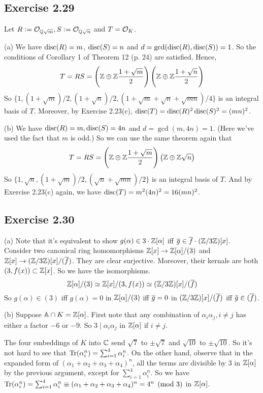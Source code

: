 \documentclass[../Marcus.tex]{subfiles}
\begin{document}
\subsection*{Exercise 2.29}

Let $R:=\mathcal{O}_{\mathbb{Q}\sqrt{m}},S:=\mathcal{O}_{\mathbb{Q}\sqrt{n}}$ and $T=\mathcal{O}_K$. 

(a) We have $\operatorname{disc}(R)=m$, $\operatorname{disc}(S)=n$ and $d=\gcd(\operatorname{disc}(R),\operatorname{disc}(S))=1$. So the conditions of Corollary 1 of Theorem 12 (p. 24) are satisfied. Hence, $$T=RS=\left(\mathbb{Z}\oplus\mathbb{Z}\frac{1+\sqrt{m}}{2}\right)\left(\mathbb{Z}\oplus\mathbb{Z}\frac{1+\sqrt{n}}{2}\right)$$ So $\{1,(1+\sqrt{m})/2,(1+\sqrt{n})/2,(1+\sqrt{m}+\sqrt{n}+\sqrt{mn})/4\}$ is an integral basis of $T$. Moreover, by Exercise 2.23(c), $\operatorname{disc}(T)=\operatorname{disc}(R)^2\operatorname{disc}(S)^2=(mn)^2$.  

(b) We have $\operatorname{disc}(R)=m,\operatorname{disc}(S)=4n$ and $d=\gcd(m,4n)=1$. (Here we've used the fact that $m$ is odd.) So we can use the same theorem again that
$$T=RS=\left(\mathbb{Z}\oplus\mathbb{Z}\frac{1+\sqrt{m}}{2}\right)\left(\mathbb{Z}\oplus\mathbb{Z}\sqrt{n}\right)$$ So $\{1,\sqrt{n},(1+\sqrt{m})/2,(\sqrt{n}+\sqrt{mn})/2\}$ is an integral basis of $T$. And by Exercise 2.23(c) again, we have $\operatorname{disc}(T)=m^2(4n)^2=16(mn)^2$.

\subsection*{Exercise 2.30}

(a) Note that it's equivalent to show $g(\alpha)\in3\cdot\mathbb{Z}[\alpha]$ iff $\overline{g}\in\overline{f}\cdot(\mathbb{Z}/3\mathbb{Z})[x]$. Consider two canonical ring homomorphisms $\mathbb{Z}[x]\to\mathbb{Z}[\alpha]/(3)$ and $\mathbb{Z}[x]\to(\mathbb{Z}/3\mathbb{Z})[x]/(\overline{f})$. They are clear surjective. Moreover, their kernals are both $(3,f(x))\subset\mathbb{Z}[x]$. So we have the isomorphisms. $$\mathbb{Z}[\alpha]/(3) \simeq \mathbb{Z}[x]/(3,f(x)) \simeq (\mathbb{Z}/3\mathbb{Z})[x]/(\overline{f})$$ So $g(\alpha)\in(3)$ iff $g(\alpha)=0$ in $\mathbb{Z}[\alpha]/(3)$ iff $\overline{g}=0$ in $(\mathbb{Z}/3\mathbb{Z})[x]/(\overline{f})$ iff $\overline{g}\in(\overline{f})$.

(b) Suppose $\mathbb{A}\cap K=\mathbb{Z}[\alpha]$. First note that any combination of $\alpha_i\alpha_j,i\neq j$ has either a factor $-6$ or $-9$. So $3\mid\alpha_i\alpha_j$ in $\mathbb{Z}[\alpha]$ if $i\neq j$.

The four embeddings of $K$ into $\mathbb{C}$ send $\sqrt{7}$ to $\pm\sqrt{7}$ and $\sqrt{10}$ to $\pm\sqrt{10}$. So it's not hard to see that $\operatorname{Tr}(\alpha_i^n)=\sum_{i=1}^4 \alpha_i^n$. On the other hand, observe that in the expanded form of $(\alpha_1+\alpha_2+\alpha_3+\alpha_4)^n$, all the terms are divisible by $3$ in $\mathbb{Z}[\alpha]$ by the previous argument, except for $\sum_{i=1}^4 \alpha_i^n$. So we have $\operatorname{Tr}(\alpha_i^n)=\sum_{i=1}^4 \alpha_i^n \equiv (\alpha_1+\alpha_2+\alpha_3+\alpha_4)^n =4^n \pmod{3}$ in $\mathbb{Z}[\alpha]$.
\end{document}
